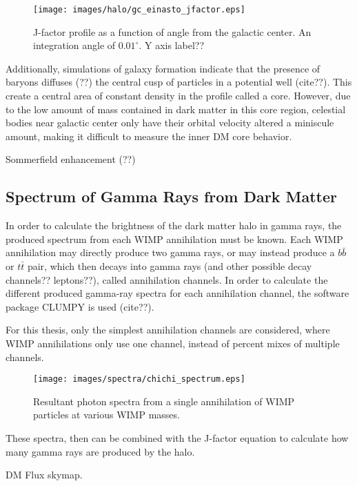    \begin{figure}[ht]
    \centering
      \texttt{[image: images/halo/gc\_einasto\_jfactor.eps]}
      \caption[Galactic Center Einasto Halo Jfactor]{
        J-factor profile as a function of angle from the galactic center.
        An integration angle of ${0.01}^{\circ}$.
        {\color{red}Y axis label??}
      }
      \label{fig:gchalo_jfactor}
    \end{figure}
    
    Additionally, simulations of galaxy formation indicate that the presence of baryons diffuses {\color{red}(??)} the central cusp of particles in a potential well {\color{red}(cite??)}.
    This create a central area of constant density in the profile called a core.
    However, due to the low amount of mass contained in dark matter in this core region, celestial bodies near galactic center only have their orbital velocity altered a miniscule amount, making it difficult to measure the inner DM core behavior.

    {\color{red}Sommerfield enhancement (??)}

    
  \subsection{Spectrum of Gamma Rays from Dark Matter}\label{dm_spectral}
    In order to calculate the brightness of the dark matter halo in gamma rays, the produced spectrum from each WIMP annihilation must be known.
    Each WIMP annihilation may directly produce two gamma rays, or may instead produce a $b\bar{b}$  or $t\bar{t}$ pair, which then decays into gamma rays {\color{red}(and other possible decay channels?? leptons??)}, called annihilation channels.
    In order to calculate the different produced gamma-ray spectra for each annihilation channel, the software package CLUMPY is used {\color{red}(cite??)}.

    For this thesis, only the simplest annihilation channels are considered, where WIMP annihilations only use one channel, instead of percent mixes of multiple channels.

    \begin{figure}[ht]
      \centering
      \texttt{[image: images/spectra/chichi\_spectrum.eps]}
      \caption[Single Annihilation Spectra]{
        Resultant photon spectra from a single annihilation of WIMP particles at various WIMP masses.}
      \label{fig:chichi_spectrum}
    \end{figure}

    These spectra, then can be combined with the J-factor equation to calculate how many gamma rays are produced by the halo.

    DM Flux skymap.
    
    
